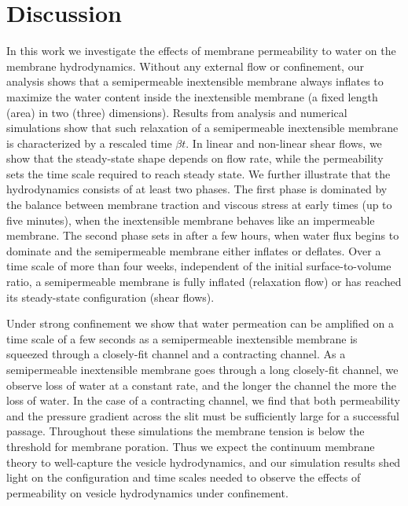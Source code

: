 \documentclass[prb,preprint,showpacs,preprintnumbers,amsmath,amssymb,longbibliography]{revtex4-1}
\begin{document}
\section{Discussion}
In this work we investigate the effects of membrane permeability to
water on the membrane hydrodynamics. Without any external flow or
confinement, our analysis shows that a semipermeable inextensible
membrane always inflates to maximize the water content inside the
inextensible membrane (a fixed length (area) in two (three) dimensions).
Results from analysis and numerical simulations show that such
relaxation of a semipermeable inextensible membrane is characterized by
a rescaled time $\beta t$. In linear and non-linear shear flows, we show
that the steady-state shape depends on flow rate, while the permeability
sets the time scale required to reach steady state. We further
illustrate that the hydrodynamics consists of at least two phases. The
first phase is dominated by the balance between membrane traction and
viscous stress at early times (up to five minutes), when the
inextensible membrane behaves like an impermeable membrane. The second
phase sets in after a few hours, when water flux begins to dominate and
the semipermeable membrane either inflates or deflates. Over a time
scale of more than four weeks, independent of the initial
surface-to-volume ratio, a semipermeable membrane is fully inflated
(relaxation flow) or has reached its steady-state configuration (shear
flows).

Under strong confinement we show that water permeation can be amplified
on a time scale of a few seconds as a semipermeable inextensible
membrane is squeezed through a closely-fit channel and a contracting
channel. As a semipermeable inextensible membrane goes through a long
closely-fit channel, we observe loss of water at a constant rate, and
the longer the channel the more the loss of water. In the case of a
contracting channel, we find that both permeability and the pressure
gradient across the slit must be sufficiently large for a successful
passage. Throughout these simulations the membrane tension is below the
threshold for membrane poration. Thus we expect the continuum membrane
theory to well-capture the vesicle hydrodynamics, and our simulation
results shed light on the configuration and time scales needed to
observe the effects of permeability on vesicle hydrodynamics under
confinement. 

\end{document}
